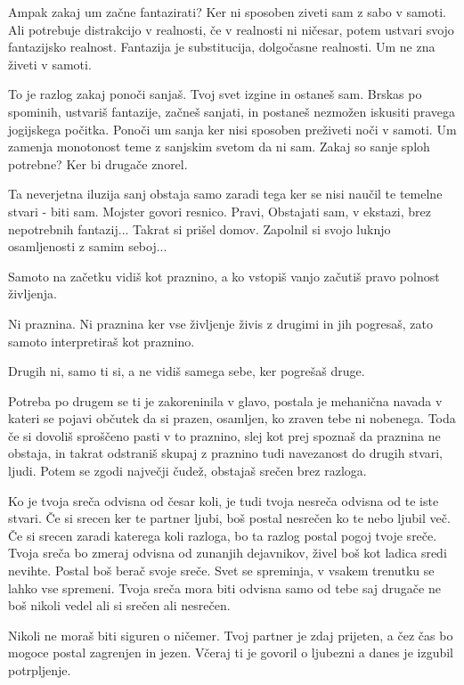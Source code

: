 Ampak zakaj um začne fantazirati? Ker ni sposoben ziveti sam z sabo v samoti. Ali potrebuje distrakcijo v realnosti, če v realnosti ni ničesar, potem ustvari svojo fantazijsko realnost. Fantazija je substitucija, dolgočasne realnosti. Um ne zna živeti v samoti. 

To je razlog zakaj ponoči sanjaš. Tvoj svet izgine in ostaneš sam. Brskas po spominih, ustvariš fantazije, začneš sanjati, in postaneš nezmožen iskusiti pravega jogijskega počitka. Ponoči um sanja ker nisi sposoben preživeti noči v samoti. Um zamenja monotonost teme z sanjskim svetom da ni sam. Zakaj so sanje sploh potrebne? Ker bi drugače znorel. 

Ta neverjetna iluzija sanj obstaja samo zaradi tega ker se nisi naučil te temelne stvari - biti sam. Mojster govori resnico. Pravi,  Obstajati sam, v ekstazi, brez nepotrebnih fantazij... Takrat si prišel domov. Zapolnil si svojo luknjo osamljenosti z samim seboj... 

Samoto na začetku vidiš kot praznino, a ko vstopiš vanjo začutiš pravo polnost življenja. 

Ni praznina. Ni praznina ker vse življenje živis z drugimi in jih pogresaš, zato samoto interpretiraš kot praznino. 

Drugih ni, samo ti si, a ne vidiš samega sebe, ker pogrešaš druge. 

Potreba po drugem se ti je zakoreninila v glavo, postala je mehanična navada v kateri se pojavi občutek da si prazen, osamljen, ko zraven tebe ni nobenega. Toda če si dovoliš sproščeno pasti v to praznino, slej kot prej spoznaš da praznina ne obstaja, in takrat odstraniš skupaj z praznino tudi navezanost do drugih stvari, ljudi. Potem se zgodi največji čudež, obstajaš srečen brez razloga. 

Ko je tvoja sreča odvisna od česar koli, je tudi tvoja nesreča odvisna od te iste stvari. Če si srecen ker te partner ljubi, boš postal nesrečen ko te nebo ljubil več. Če si srecen zaradi katerega koli razloga, bo ta razlog postal pogoj tvoje sreče. Tvoja sreča bo zmeraj odvisna od zunanjih dejavnikov, živel boš kot ladica sredi nevihte. Postal boš berač svoje sreče. Svet se spreminja, v vsakem trenutku se lahko vse spremeni. Tvoja sreča mora biti odvisna samo od tebe saj drugače ne boš nikoli vedel ali si srečen ali nesrečen. 

Nikoli ne moraš biti siguren o ničemer. Tvoj partner je zdaj prijeten, a čez čas bo mogoce postal zagrenjen in jezen. Včeraj ti je govoril o ljubezni a danes je izgubil potrpljenje. 

